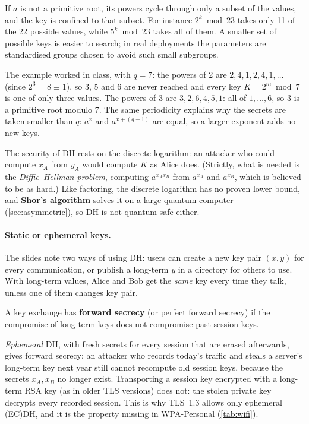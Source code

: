 \begin{remark}
If $a$ is not a primitive root, its powers cycle through only a subset of the values, and the key is confined to that subset. For instance $2^k \bmod 23$ takes only 11 of the 22 possible values, while $5^k \bmod 23$ takes all of them. A smaller set of possible keys is easier to search; in real deployments the parameters are standardised groups chosen to avoid such small subgroups.

The example worked in class, with $q = 7$: the powers of 2 are $2, 4, 1, 2, 4, 1, \dots$ (since $2^3 = 8 \equiv 1$), so 3, 5 and 6 are never reached and every key $K = 2^{m} \bmod 7$ is one of only three values. The powers of 3 are $3, 2, 6, 4, 5, 1$: all of $1, \dots, 6$, so 3 is a primitive root modulo 7. The same periodicity explains why the secrets are taken smaller than $q$: $a^{x}$ and $a^{x + (q-1)}$ are equal, so a larger exponent adds no new keys.
\end{remark}

The security of DH rests on the discrete logarithm: an attacker who could compute $x_A$ from $y_A$ would compute $K$ as Alice does. (Strictly, what is needed is the \emph{Diffie--Hellman problem}, computing $a^{x_A x_B}$ from $a^{x_A}$ and $a^{x_B}$, which is believed to be as hard.) Like factoring, the discrete logarithm has no proven lower bound, and \textbf{Shor's algorithm} solves it on a large quantum computer (\cref{sec:asymmetric}), so DH is not quantum-safe either.

\paragraph{Static or ephemeral keys.} The slides note two ways of using DH: users can create a new key pair $(x, y)$ for every communication, or publish a long-term $y$ in a directory for others to use. With long-term values, Alice and Bob get the \emph{same} key every time they talk, unless one of them changes key pair.

\begin{definition}
A key exchange has \textbf{forward secrecy} (or perfect forward secrecy) if the compromise of long-term keys does not compromise past session keys.
\end{definition}

\emph{Ephemeral} DH, with fresh secrets for every session that are erased afterwards, gives forward secrecy: an attacker who records today's traffic and steals a server's long-term key next year still cannot recompute old session keys, because the secrets $x_A, x_B$ no longer exist. Transporting a session key encrypted with a long-term RSA key (as in older TLS versions) does not: the stolen private key decrypts every recorded session. This is why TLS~1.3 allows only ephemeral (EC)DH, and it is the property missing in WPA-Personal (\cref{tab:wifi}).

